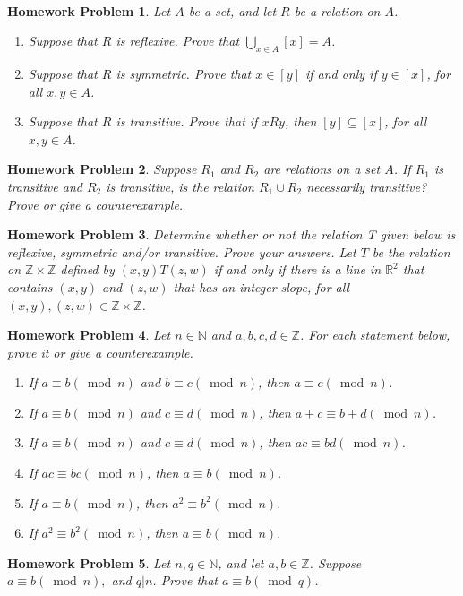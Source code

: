 \documentclass{article}
\newtheorem{hw}{Homework Problem}
\newcommand{\R}{\mathbb{R}}
\newcommand{\Z}{\mathbb{Z}}
\newcommand{\N}{\mathbb{N}}
\begin{document}
	\
	\begin{hw}
		Let $A$ be a set, and let $R$ be a relation on $A$.
		\begin{enumerate}
			\item Suppose that $R$ is reflexive. Prove that $\bigcup_{x \in A} [x] =A$.
			\item Suppose that $R$ is symmetric. Prove that $x \in [y]$ if and only if $y\in [x]$, for all $x, y \in A$.
			\item Suppose that $R$ is transitive. Prove that if $x R y$, then $[y] \subseteq [x]$, for all $x, y \in A$.
		\end{enumerate}
	\end{hw}
	\begin{hw}
		Suppose $R_1$ and $R_2$ are relations on a set $A$.
		If $R_1$ is transitive and $R_2$ is transitive, is the relation $R_1 \cup R_2$ necessarily transitive? Prove or give a counterexample.
	\end{hw}
	\begin{hw}
		Determine whether or not the relation T given below is reflexive, symmetric and/or transitive. Prove your answers.
		Let $T$ be the relation on $\Z  \times \Z$ defined by $(x, y) T (z, w)$ if and only if there is a line in $\R^2$ that contains $(x, y)$ and $(z, w)$ that has an integer slope, for all $(x, y), (z, w) \in \Z \times \Z$.
	\end{hw}
	\begin{hw}
		Let $n \in \N$ and $a, b, c, d \in \Z$. For each statement below, prove it or give a counterexample.
		\begin{enumerate}
			\item  If $a \equiv b (\bmod n)$ and $b \equiv c (\bmod n)$, then $a \equiv c (\bmod n)$.
			\item  If $a \equiv b (\bmod n)$ and $c \equiv d (\bmod n)$, then $a+c \equiv b+d (\bmod n)$.
			\item  If $a \equiv b (\bmod n)$ and $c \equiv d (\bmod n)$, then $ac \equiv bd (\bmod n)$.
			\item  If $ac \equiv bc (\bmod n)$, then $a \equiv b (\bmod n)$.
			\item  If $a \equiv b (\bmod n)$, then $a^2 \equiv b^2 (\bmod n)$.
			\item  If $a^2 \equiv b^2 (\bmod n)$, then $a \equiv b (\bmod n)$.
		\end{enumerate}
	\end{hw}
	\begin{hw}
		Let $n, q \in \N$, and let $a, b \in \Z$. Suppose $a \equiv b (\bmod{n}),$ and $q|n$. Prove that $a \equiv b (\bmod{q})$.
	\end{hw}
\end{document}
